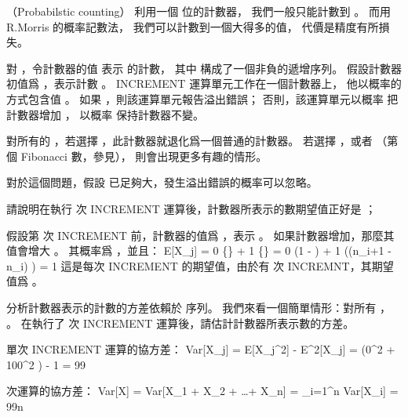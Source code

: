 \startsubject[
  title={Problems},
]

\startPROBLEM（Probabilstic counting）
利用一個  位的計數器，
我們一般只能計數到 。
而用 R.Morris 的{\EMP 概率記數法}，
我們可以計數到一個大得多的值，
代價是精度有所損失。

對 ，令計數器的值  表示  的計數，
其中  構成了一個非負的遞增序列。
假設計數器初值爲 ，表示計數 。
INCREMENT 運算單元工作在一個計數器上，
他以概率的方式包含值 。
如果 ，則該運算單元報告溢出錯誤；
否則，該運算單元以概率  把計數器增加 ，
以概率  保持計數器不變。

對所有的 ，若選擇 ，此計數器就退化爲一個普通的計數器。
若選擇 ，或者 （第  個 Fibonacci 數，參見），
則會出現更多有趣的情形。

對於這個問題，假設  已足夠大，發生溢出錯誤的概率可以忽略。

\startigBase[a]
\item 請說明在執行  次 INCREMENT 運算後，計數器所表示的數期望值正好是 ；

\startANSWER
假設第  次 INCREMENT 前，計數器的值爲 ，表示 。
如果計數器增加，那麼其值會增大 。
其概率爲 ，並且：
\startformula\startmathalignment
\NC E[X_j] \NC= 0 \cdot \Pr\{\} + 1 \cdot \Pr\{\} \NR
\NC        \NC= 0 \cdot \left(1 - \right) +
                1 \cdot \left((n_{i+1} - n_i) \cdot {}\right) \NR
\NC        \NC= 1 \NR
\stopmathalignment\stopformula
這是每次 INCREMENT 的期望值，由於有  次 INCREMNT，其期望值爲 。
\stopANSWER

\item 分析計數器表示的計數的方差依賴於  序列。
我們來看一個簡單情形：對所有 ， 。
在執行了  次 INCREMENT 運算後，請估計計數器所表示數的方差。

\startANSWER
單次 INCREMENT 運算的協方差：
\startformula\startmathalignment
\NC Var[X_j] \NC= E[X_j^2] - E^2[X_j] \NR
\NC           \NC= \left(0^2 \cdot {} + 100^2 \right) - 1 \NR
\NC           \NC= 99 \NR
\stopmathalignment\stopformula

 次運算的協方差：
\startformula
Var[X] = Var[X_1 + X_2 + \ldots + X_n] = \sum_{i=1}^n Var[X_i] = 99n
\stopformula
\stopANSWER
\stopigBase
\stopPROBLEM

